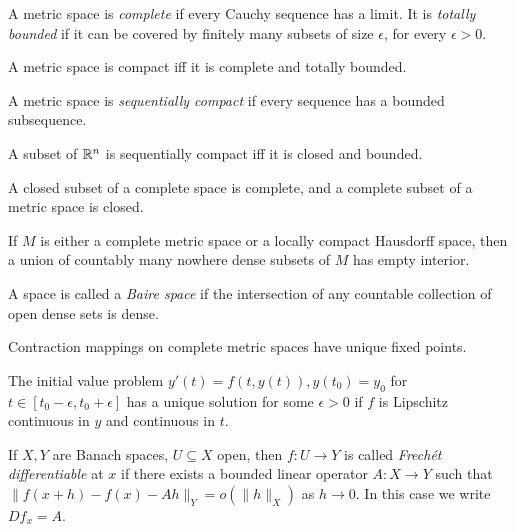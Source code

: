 \begin{defn} A metric space is \emph{complete} if every Cauchy sequence has a limit. It is \emph{totally bounded} if it can be covered by finitely many subsets of size $\epsilon$, for every $\epsilon > 0$.
\end{defn}

\begin{thm} A metric space is compact iff it is complete and totally bounded.
\end{thm}

\begin{defn} A metric space is \emph{sequentially compact} if every sequence has a bounded subsequence.
\end{defn}

\begin{thm} A subset of $\mathbb{R}^n$ is sequentially compact iff it is closed and bounded.
\end{thm}

\begin{prop} A closed subset of a complete space is complete, and a complete subset of a metric space is closed.
\end{prop}

\begin{thm} If $M$ is either a complete metric space or a locally compact Hausdorff space, then a union of countably many nowhere dense subsets of $M$ has empty interior.
\end{thm}

\begin{defn} A space is called a \emph{Baire space} if the intersection of any countable collection of open dense sets is dense.
\end{defn}

\begin{thm} Contraction mappings on complete metric spaces have unique fixed points.
\end{thm}

\begin{cor} The initial value problem $y'(t) = f(t,y(t)), y(t_0) = y_0$ for $t \in [t_0-\epsilon,t_0+\epsilon]$ has a unique solution for some $\epsilon > 0$ if $f$ is Lipschitz continuous in $y$ and continuous in $t$.
\end{cor}

\begin{defn} If $X,Y$ are Banach spaces, $U \subseteq X$ open, then $f:U\rightarrow Y$ is called \emph{Frech\'et differentiable} at $x$ if there exists a bounded linear operator $A:X\rightarrow Y$ such that $\|f(x+h) - f(x) - Ah\|_Y = o(\|h\|_X)$ as $h \rightarrow 0$. In this case we write $Df_x = A$.
\end{defn}

